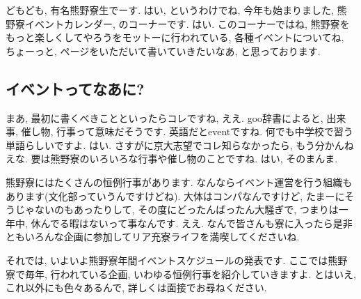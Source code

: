 \documentclass[10pt,b5jsbook,dvips,dvipdfmx,openany]{jsbook}
\theoremstyle{definition}
\begin{document}
 		どもども, 有名熊野寮生でーす. はい, というわけでね, 今年も始まりました, 熊野寮イベントカレンダー, のコーナーです. はい. このコーナーではね, 熊野寮をもっと楽しくしてやろうをモットーに行われている, 各種イベントについてね, ちょーっと, ページをいただいて書いていきたいなあ, と思っております.

		\subsection{イベントってなあに? }

 		まあ, 最初に書くべきことといったらコレですね, ええ. goo辞書によると, 出来事, 催し物, 行事って意味だそうです. 英語だとeventですね. 何でも中学校で習う単語らしいですよ. はい. さすがに京大志望でコレ知らなかったら, もう分かんねえな. 要は熊野寮のいろいろな行事や催し物のことですね. はい, そのまんま.

 		熊野寮にはたくさんの恒例行事があります. なんならイベント運営を行う組織もあります(文化部っていうんですけどね). 大体はコンパなんですけど, たまーにそうじゃないのもあったりして, その度にどったんばったん大騒ぎで, つまりは一年中, 休んでる暇はないって事なんです. ええ. なんで皆さんも寮に入ったら是非ともいろんな企画に参加してリア充寮ライフを満喫してくださいね.

		それでは, いよいよ熊野寮年間イベントスケジュールの発表です. ここでは熊野寮で毎年, 行われている企画, いわゆる恒例行事を紹介していきますよ. とはいえ, これ以外にも色々あるんで, 詳しくは面接でお尋ねください.
\end{document}
